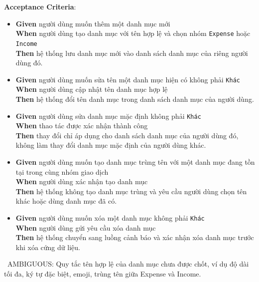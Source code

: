 \textbf{Acceptance Criteria}:

\begin{itemize}
\item \textbf{Given} người dùng muốn thêm một danh mục mới  \\ \hspace*{1.5em}  \textbf{When} người dùng tạo danh mục với tên hợp lệ và chọn nhóm \texttt{Expense} hoặc \texttt{Income}  \\ \hspace*{1.5em}  \textbf{Then} hệ thống lưu danh mục mới vào danh sách danh mục của riêng người dùng đó.
\item \textbf{Given} người dùng muốn sửa tên một danh mục hiện có không phải \texttt{Khác}  \\ \hspace*{1.5em}  \textbf{When} người dùng cập nhật tên danh mục hợp lệ  \\ \hspace*{1.5em}  \textbf{Then} hệ thống đổi tên danh mục trong danh sách danh mục của người dùng.
\item \textbf{Given} người dùng sửa danh mục mặc định không phải \texttt{Khác}  \\ \hspace*{1.5em}  \textbf{When} thao tác được xác nhận thành công  \\ \hspace*{1.5em}  \textbf{Then} thay đổi chỉ áp dụng cho danh sách danh mục của người dùng đó, không làm thay đổi danh mục mặc định của người dùng khác.
\item \textbf{Given} người dùng muốn tạo danh mục trùng tên với một danh mục đang tồn tại trong cùng nhóm giao dịch  \\ \hspace*{1.5em}  \textbf{When} người dùng xác nhận tạo danh mục  \\ \hspace*{1.5em}  \textbf{Then} hệ thống không tạo danh mục trùng và yêu cầu người dùng chọn tên khác hoặc dùng danh mục đã có.
\item \textbf{Given} người dùng muốn xóa một danh mục không phải \texttt{Khác}  \\ \hspace*{1.5em}  \textbf{When} người dùng gửi yêu cầu xóa danh mục  \\ \hspace*{1.5em}  \textbf{Then} hệ thống chuyển sang luồng cảnh báo và xác nhận xóa danh mục trước khi xóa cứng dữ liệu.
\end{itemize}
\warningicon\  AMBIGUOUS: Quy tắc tên hợp lệ của danh mục chưa được chốt, ví dụ độ dài tối đa, ký tự đặc biệt, emoji, trùng tên giữa Expense và Income.



